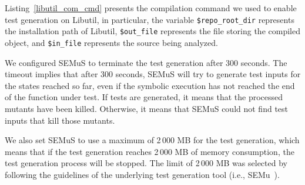 Listing~\ref{libutil_com_cmd} presents the compilation command we used to enable test generation on Libutil, in particular, the variable \texttt{\$repo\_root\_dir} represents the installation path of Libutil, \texttt{\$out\_file} represents the file storing the compiled object, and \texttt{\$in\_file} represents the source being analyzed.


We configured SEMuS to terminate the test generation after 300 seconds. The timeout implies that after 300 seconds, SEMuS will try to generate test inputs for the states reached so far, even if the symbolic execution has not reached the end of the function under test. If tests are generated, it means that the processed mutants have been killed. Otherwise, it means that SEMuS could not find test inputs that kill those mutants.


We also set SEMuS to use a maximum of 2\,000 MB for the test generation, which means that if the test generation reaches 2\,000 MB of memory consumption, the test generation process will be stopped. The limit of 2\,000 MB was selected by following the guidelines of the underlying test generation tool (i.e., SEMu~\cite{titcheu2021killing}).


